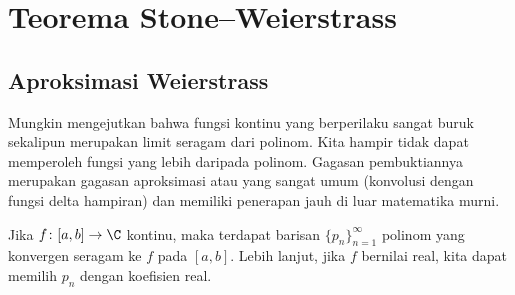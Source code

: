 \sectionnewpage
\section{Teorema Stone--Weierstrass}
\label{sec:stoneweier}



\subsection{Aproksimasi Weierstrass}

Mungkin mengejutkan bahwa fungsi kontinu yang berperilaku sangat buruk sekalipun
merupakan limit seragam dari polinom.
Kita hampir tidak dapat memperoleh fungsi yang lebih 
daripada polinom.
Gagasan pembuktiannya merupakan gagasan aproksimasi atau 
yang sangat umum (konvolusi dengan fungsi delta hampiran) dan memiliki penerapan
jauh di luar matematika murni.

\begin{thm}
Jika $f \colon [a,b] \to \C$ kontinu, maka terdapat barisan
$\{ p_n \}_{n=1}^\infty$ polinom yang konvergen seragam ke $f$ pada $[a,b]$.
Lebih lanjut, jika $f$ bernilai real, kita dapat memilih $p_n$ dengan koefisien real.
\end{thm}

